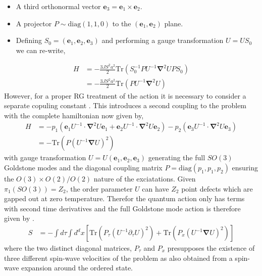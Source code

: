 \documentclass[notitlepage,onecolumn,showpacs,11pt]{revtex4-1}
\newcommand{\mbf}[1]{\mathbf{#1}}
\newcommand{\grad}{\boldsymbol{\nabla}}
\newcommand{\Tr}{\text{Tr}}
\begin{document}
\begin{itemize}
    \item A third orthonormal vector $\mbf{e}_3=\mbf{e}_1\times\mbf{e}_{2}$.
    \item A projector $P\sim\text{diag}\left(1,1,0\right)$ to the 
        $(\mbf{e}_1,\mbf{e}_2)$ plane.
    \item Defining $S_0=(\mbf{e}_1,\mbf{e}_2,\mbf{e}_3)$ and performing a 
        gauge transformation $U = US_0$ we can re-write,
\end{itemize}

\begin{equation}
    \begin{aligned}
        H &= -\frac{3JS^2a^2}{2} 
        \Tr\left(S_0^{-1}P U^{-1}\grad^2U PS_0\right)\\
        &= -\frac{3JS^2a^2}{2} \Tr\left(PU^{-1}\grad^2U\right)
    \end{aligned}
\end{equation}
However, for a proper RG treatment of the action it is necessary to consider 
a separate copuling constant \cite{azaria-93}. 
This introduces a second coupling to the problem with the complete hamiltonian 
now given by,
\begin{equation}
    \begin{aligned}
        H &= -p_1\left(\mbf{e}_1 U^{-1}\cdot\grad^2U\mbf{e}_1
        +\mbf{e}_2 U^{-1}\cdot\grad^2U\mbf{e}_2
        \right)
        -p_2\left(\mbf{e}_3 U^{-1}\cdot\grad^2U\mbf{e}_3\right)\\
        &=-\Tr\left(P(U^{-1}\grad U)^2\right)
    \end{aligned}
\end{equation}
with gauge transformation $U = U (\mbf{e}_1,\mbf{e}_2,\mbf{e}_3)$ generating 
the full $SO(3)$ Goldstone modes and the diagonal coupling matrix 
$P=\text{diag}(p_1,p_1,p_2)$ ensuring the $O(3)\times O(2)/O(2)$ nature of 
the exciatations. Given $\pi_1(SO(3))=Z_2$, the order parameter $U$ can have 
$Z_2$ point defects which are gapped out at zero temperature. Therefor the 
quantum action only has terms with second time derivatives and the full 
Goldstone mode action is therefore given by \cite{dombre-88,azaria-92}.
\begin{equation}
    \begin{aligned}
        S &=-\int d\tau\int d^dx 
        \left[
        \Tr\left(P_\tau(U^{-1}\partial_\tau U)^2\right)
        +
        \Tr\left(P_x(U^{-1}\grad U)^2\right)
        \right]
    \end{aligned}
\end{equation}
where the two distinct diagonal matrices, $P_\tau$ and $P_x$ presupposes the 
existence of three different spin-wave velocities of the problem as also 
obtained from a spin-wave expansion around the ordered state.
\end{document}

